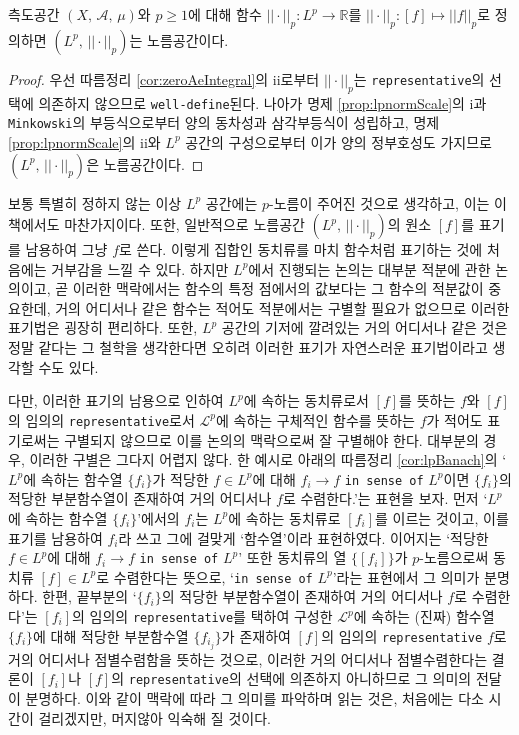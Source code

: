 \begin{proposition}
    측도공간 $(X,\,\mathcal{A},\,\mu)$와 $p\geq1$에 대해 함수 $||\cdot||_p:L^p\to\mathbb{R}$를 $||\cdot||_p:[f]\mapsto||f||_p$로 정의하면 $(L^p,\,||\cdot||_p)$는 노름공간이다.
\end{proposition}

\begin{proof}
    우선 따름정리 \ref{cor:zeroAeIntegral}의 ii로부터 $||\cdot||_p$는 \texttt{representative}의 선택에 의존하지 않으므로 \texttt{well-define}된다. 나아가 명제 \ref{prop:lpnormScale}의 i과 \texttt{Minkowski}의 부등식으로부터 양의 동차성과 삼각부등식이 성립하고, 명제 \ref{prop:lpnormScale}의 ii와 $L^p$ 공간의 구성으로부터 이가 양의 정부호성도 가지므로 $(L^p,\,||\cdot||_p)$은 노름공간이다.
\end{proof}

보통 특별히 정하지 않는 이상 $L^p$ 공간에는 $p$-노름이 주어진 것으로 생각하고, 이는 이 책에서도 마찬가지이다. 또한, 일반적으로 노름공간 $(L^p,\,||\cdot||_p)$의 원소 $[f]$를 표기를 남용하여 그냥 $f$로 쓴다. 이렇게 집합인 동치류를 마치 함수처럼 표기하는 것에 처음에는 거부감을 느낄 수 있다. 하지만 $L^p$에서 진행되는 논의는 대부분 적분에 관한 논의이고, 곧 이러한 맥락에서는 함수의 특정 점에서의 값보다는 그 함수의 적분값이 중요한데, 거의 어디서나 같은 함수는 적어도 적분에서는 구별할 필요가 없으므로 이러한 표기법은 굉장히 편리하다. 또한, $L^p$ 공간의 기저에 깔려있는 거의 어디서나 같은 것은 정말 같다는 그 철학을 생각한다면 오히려 이러한 표기가 자연스러운 표기법이라고 생각할 수도 있다.

다만, 이러한 표기의 남용으로 인하여 $L^p$에 속하는 동치류로서 $[f]$를 뜻하는 $f$와 $[f]$의 임의의 \texttt{representative}로서 $\mathcal{L}^p$에 속하는 구체적인 함수를 뜻하는 $f$가 적어도 표기로써는 구별되지 않으므로 이를 논의의 맥락으로써 잘 구별해야 한다. 대부분의 경우, 이러한 구별은 그다지 어렵지 않다. 한 예시로 아래의 따름정리 \ref{cor:lpBanach}의 `$L^p$에 속하는 함수열 $\{f_i\}$가 적당한 $f\in L^p$에 대해 $f_i\to f$ \texttt{in sense of} $L^p$이면 $\{f_i\}$의 적당한 부분함수열이 존재하여 거의 어디서나 $f$로 수렴한다.'는 표현을 보자. 먼저 `$L^p$에 속하는 함수열 $\{f_i\}$'에서의 $f_i$는 $L^p$에 속하는 동치류로 $[f_i]$를 이르는 것이고, 이를 표기를 남용하여 $f_i$라 쓰고 그에 걸맞게 `함수열'이라 표현하였다. 이어지는 `적당한 $f\in L^p$에 대해 $f_i\to f$ \texttt{in sense of} $L^p$' 또한 동치류의 열 $\{[f_i]\}$가 $p$-노름으로써 동치류 $[f]\in L^p$로 수렴한다는 뜻으로, `\texttt{in sense of} $L^p$'라는 표현에서 그 의미가 분명하다. 한편, 끝부분의 `$\{f_i\}$의 적당한 부분함수열이 존재하여 거의 어디서나 $f$로 수렴한다'는 $[f_i]$의 임의의 \texttt{representative}를 택하여 구성한 $\mathcal{L}^p$에 속하는 (진짜) 함수열 $\{f_i\}$에 대해 적당한 부분함수열 $\{f_{i_j}\}$가 존재하여 $[f]$의 임의의 \texttt{representative} $f$로 거의 어디서나 점별수렴함을 뜻하는 것으로, 이러한 거의 어디서나 점별수렴한다는 결론이 $[f_i]$나 $[f]$의 \texttt{representative}의 선택에 의존하지 아니하므로 그 의미의 전달이 분명하다. 이와 같이 맥락에 따라 그 의미를 파악하며 읽는 것은, 처음에는 다소 시간이 걸리겠지만, 머지않아 익숙해 질 것이다.


